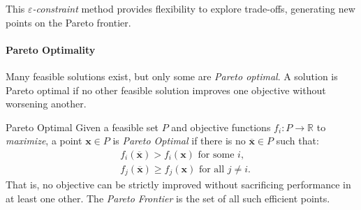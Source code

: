 This \emph{$\varepsilon$-constraint} method provides flexibility to explore trade-offs, generating new points on the Pareto frontier.

\paragraph{Pareto Optimality}

Many feasible solutions exist, but only some are \emph{Pareto optimal}. A solution is Pareto optimal if no other feasible solution improves one objective without worsening another.

\begin{definition}{Pareto Optimal}
Given a feasible set \(P\) and objective functions \(f_i: P \to \mathbb{R}\) to \emph{maximize}, a point \(\mathbf{x} \in P\) is \emph{Pareto Optimal} if there is no \(\overline{\mathbf{x}} \in P\) such that:
\[
\begin{aligned}
& f_i(\overline{\mathbf{x}}) > f_i(\mathbf{x}) \text{ for some } i, \\
& f_j(\overline{\mathbf{x}}) \ge f_j(\mathbf{x}) \text{ for all } j \ne i.
\end{aligned}
\]
That is, no objective can be strictly improved without sacrificing performance in at least one other. The \emph{Pareto Frontier} is the set of all such efficient points.
\end{definition}

